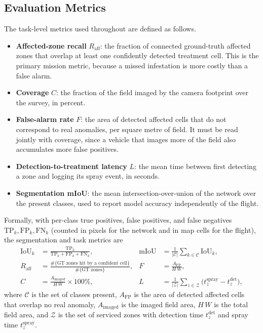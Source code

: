 \documentclass[12pt,a4paper]{article}
\begin{document}
\subsection{Evaluation Metrics}
The task-level metrics used throughout are defined as follows.
\begin{itemize}
    \item \textbf{Affected-zone recall} $R_{\mathrm{aff}}$: the fraction of
          connected ground-truth affected zones that overlap at least one confidently
          detected treatment cell. This is the primary mission metric, because a
          missed infestation is more costly than a false alarm.
    \item \textbf{Coverage} $C$: the fraction of the field imaged by the camera
          footprint over the survey, in percent.
    \item \textbf{False-alarm rate} $F$: the area of detected affected cells that do
          not correspond to real anomalies, per square metre of field. It must be
          read jointly with coverage, since a vehicle that images more of the field
          also accumulates more false positives.
    \item \textbf{Detection-to-treatment latency} $L$: the mean time between first
          detecting a zone and logging its spray event, in seconds.
    \item \textbf{Segmentation mIoU}: the mean intersection-over-union of the network
          over the present classes, used to report model accuracy independently of
          the flight.
\end{itemize}
Formally, with per-class true positives, false positives, and false negatives
$\mathrm{TP}_k,\mathrm{FP}_k,\mathrm{FN}_k$ (counted in pixels for the network and in map
cells for the flight), the segmentation and task metrics are
\begin{align}
    \mathrm{IoU}_k &= \frac{\mathrm{TP}_k}{\mathrm{TP}_k+\mathrm{FP}_k+\mathrm{FN}_k},
        & \mathrm{mIoU} &= \frac{1}{|\mathcal{C}|}\sum_{k\in\mathcal{C}} \mathrm{IoU}_k,
        \label{eq:iou}\\[2pt]
    R_{\mathrm{aff}} &= \frac{\#\{\text{GT zones hit by a confident cell}\}}{\#\{\text{GT zones}\}},
        & F &= \frac{A_{\mathrm{FP}}}{H\,W}, \label{eq:raff}\\[2pt]
    C &= \frac{A_{\mathrm{imaged}}}{H\,W}\times 100\%,
        & L &= \frac{1}{|\mathcal{Z}|}\sum_{z\in\mathcal{Z}} \big(t^{\mathrm{spray}}_z - t^{\mathrm{det}}_z\big),
        \label{eq:latency}
\end{align}
where $\mathcal{C}$ is the set of classes present, $A_{\mathrm{FP}}$ is the area of
detected affected cells that overlap no real anomaly, $A_{\mathrm{imaged}}$ is the imaged
field area, $H\,W$ is the total field area, and $\mathcal{Z}$ is the set of serviced
zones with detection time $t^{\mathrm{det}}_z$ and spray time $t^{\mathrm{spray}}_z$.
\end{document}
